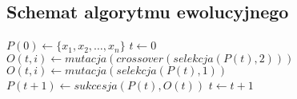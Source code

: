 \documentclass[12pt, a4paper]{article}
\begin{document}
\subsection{Schemat algorytmu ewolucyjnego}

\begin{algorithm}[!htb]
\label{ea}
\begin{algorithmic}[1]

	\State $P(0) \gets \{x_1, x_2, \ldots, x_n\}$
	\State $t \gets 0$
    			\State $O(t,i) \gets mutacja(crossover(selekcja(P(t), 2)))$
    		\Else
    			\State $O(t,i) \gets mutacja(selekcja(P(t),1))$
    		\EndIf
    	\EndFor
    \State $P(t+1) \gets sukcesja(P(t),O(t))$
    \State $t \gets t+1$
  	\EndWhile
\EndFunction
\end{algorithmic}
\end{algorithm}

\nocite{*}


\end{document}

